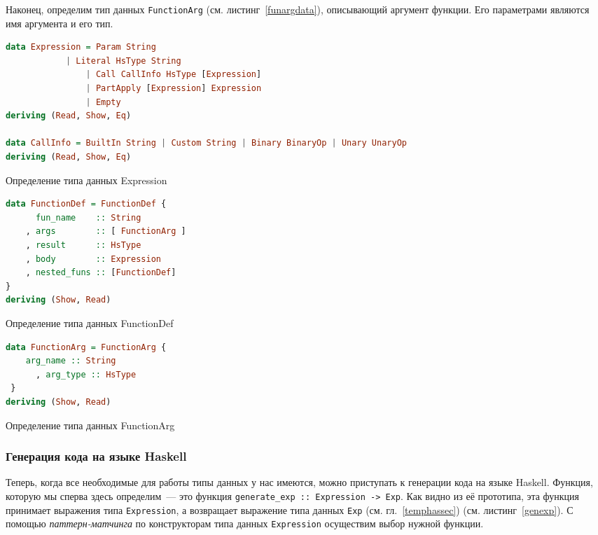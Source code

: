 		Наконец, определим тип данных \lstinline!FunctionArg! (см. листинг~\ref{funargdata}), описывающий аргумент функции. Его параметрами являются имя аргумента и его тип. 
		
		\begin{ListingEnv}[h]
		\begin{lstlisting}[language=Haskell]
data Expression = Param String
	        | Literal HsType String
                | Call CallInfo HsType [Expression]
                | PartApply [Expression] Expression
                | Empty
deriving (Read, Show, Eq)	
	
data CallInfo = BuiltIn String | Custom String | Binary BinaryOp | Unary UnaryOp
deriving (Read, Show, Eq)
		\end{lstlisting}
		\caption{Определение типа данных Expression}\label{expdata}
		\end{ListingEnv}
	
	\begin{ListingEnv}[h]
	\begin{lstlisting}[language=Haskell]
data FunctionDef = FunctionDef { 
	  fun_name    :: String
	, args        :: [ FunctionArg ]
	, result      :: HsType 
	, body        :: Expression
	, nested_funs :: [FunctionDef] 
} 
deriving (Show, Read)
	\end{lstlisting}
	\caption{Определение типа данных FunctionDef}\label{fundata}
	\end{ListingEnv}

\begin{ListingEnv}[h]
\begin{lstlisting}[language=Haskell]
data FunctionArg = FunctionArg { 
	arg_name :: String
      , arg_type :: HsType 
 }
deriving (Show, Read)
\end{lstlisting}
\caption{Определение типа данных FunctionArg}\label{funargdata}
\end{ListingEnv}
		
		\subsubsection{Генерация кода на языке Haskell}
		Теперь, когда все необходимые для работы типы данных у нас имеются, можно приступать к генерации кода на языке Haskell. Функция, которую мы сперва здесь определим~--- это функция \lstinline!generate_exp :: Expression -> Exp!. Как видно из её прототипа, эта функция принимает выражения типа \lstinline!Expression!, а возвращает выражение типа данных \lstinline!Exp! (см. гл.~\ref{temphassec}) (см. листинг~\ref{genexp}). С помощью \textit{паттерн-матчинга} по конструкторам типа данных \lstinline!Expression! осуществим выбор нужной функции.

